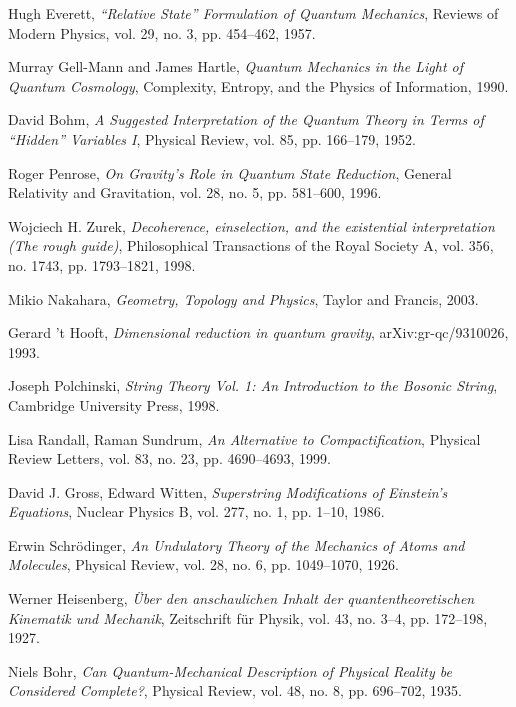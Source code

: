 \documentclass[12pt]{article}
\begin{document}
\begin{thebibliography}{999}
Hugh Everett,
\textit{“Relative State” Formulation of Quantum Mechanics},
Reviews of Modern Physics, vol. 29, no. 3, pp. 454–462, 1957.

Murray Gell-Mann and James Hartle,
\textit{Quantum Mechanics in the Light of Quantum Cosmology},
Complexity, Entropy, and the Physics of Information, 1990.

David Bohm,
\textit{A Suggested Interpretation of the Quantum Theory in Terms of “Hidden” Variables I},
Physical Review, vol. 85, pp. 166–179, 1952.

Roger Penrose,
\textit{On Gravity's Role in Quantum State Reduction},
General Relativity and Gravitation, vol. 28, no. 5, pp. 581–600, 1996.

Wojciech H. Zurek,
\textit{Decoherence, einselection, and the existential interpretation (The rough guide)},
Philosophical Transactions of the Royal Society A, vol. 356, no. 1743, pp. 1793–1821, 1998.

Mikio Nakahara,
\textit{Geometry, Topology and Physics},
Taylor and Francis, 2003.

Gerard ’t Hooft,
\textit{Dimensional reduction in quantum gravity},
arXiv:gr-qc/9310026, 1993.

Joseph Polchinski,
\textit{String Theory Vol. 1: An Introduction to the Bosonic String},
Cambridge University Press, 1998.

Lisa Randall, Raman Sundrum,
\textit{An Alternative to Compactification},
Physical Review Letters, vol. 83, no. 23, pp. 4690–4693, 1999.

David J. Gross, Edward Witten,
\textit{Superstring Modifications of Einstein’s Equations},
Nuclear Physics B, vol. 277, no. 1, pp. 1–10, 1986.

Erwin Schrödinger,
\textit{An Undulatory Theory of the Mechanics of Atoms and Molecules},
Physical Review, vol. 28, no. 6, pp. 1049–1070, 1926.

Werner Heisenberg,
\textit{Über den anschaulichen Inhalt der quantentheoretischen Kinematik und Mechanik},
Zeitschrift für Physik, vol. 43, no. 3–4, pp. 172–198, 1927.

Niels Bohr,
\textit{Can Quantum-Mechanical Description of Physical Reality be Considered Complete?},
Physical Review, vol. 48, no. 8, pp. 696–702, 1935.


\end{thebibliography}
\end{document}
